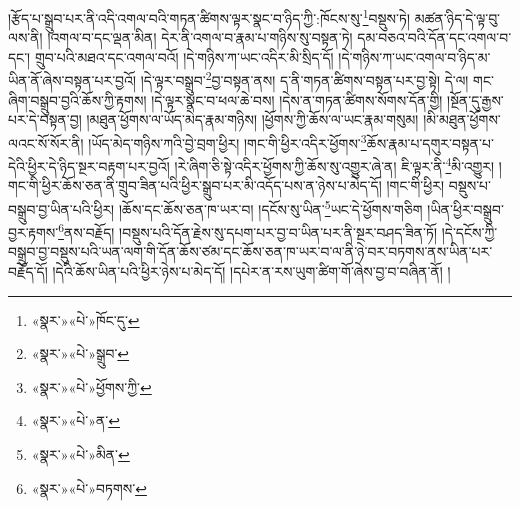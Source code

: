 །རྩོད་པ་སྒྲུབ་པར་ནི་འདི་འགལ་བའི་གཏན་ཚིགས་ལྟར་སྣང་བ་ཉིད་ཀྱི་:ཁོངས་སུ་\footnote{«སྣར་»«པེ་»ཁོང་དུ་}བསྡུས་ཏེ། མཚན་ཉིད་དེ་ལྟ་བུ་ལས་ནི། །འགལ་བ་དང་ལྡན་མིན། དེར་ནི་འགལ་བ་རྣམ་པ་གཉིས་སུ་བསྟན་ཏེ། དམ་བཅའ་བའི་དོན་དང་འགལ་བ་དང་། གྲུབ་པའི་མཐའ་དང་འགལ་བའོ། །དེ་གཉིས་ཀ་ཡང་འདིར་མི་སྲིད་དོ། །དེ་གཉིས་ཀ་ཡང་འགལ་བ་ཉིད་མ་ཡིན་ནོ་ཞེས་བསྟན་པར་བྱའོ། །དེ་ལྟར་བསྒྲུབ་\footnote{«སྣར་»«པེ་»སྒྲུབ་}བྱ་བསྟན་ནས། ད་ནི་གཏན་ཚིགས་བསྟན་པར་བྱ་སྟེ། དེ་ལ། གང་ཞིག་བསྒྲུབ་བྱའི་ཆོས་ཀྱི་རྟགས། །དེ་ལྟར་སྣང་བ་ཕལ་ཆེ་བས། །དེས་ན་གཏན་ཚིགས་སོགས་དོན་གྱི། །སྔོན་དུ་རྒྱས་པར་དེ་བསྟན་བྱ། །མཐུན་ཕྱོགས་ལ་ཡོད་མེད་རྣམ་གཉིས། །ཕྱོགས་ཀྱི་ཆོས་ལ་ཡང་རྣམ་གསུམ། །མི་མཐུན་ཕྱོགས་ལའང་སོ་སོར་ནི། །ཡོད་མེད་གཉིས་ཀའི་བྱེ་བྲག་ཕྱིར། །གང་གི་ཕྱིར་འདིར་ཕྱོགས་\footnote{«སྣར་»«པེ་»ཕྱོགས་ཀྱི་}ཆོས་རྣམ་པ་དགུར་བསྟན་པ་དེའི་ཕྱིར་དེ་ཉིད་སྔར་བརྟག་པར་བྱའོ། །རེ་ཞིག་ཅི་སྟེ་འདིར་ཕྱོགས་ཀྱི་ཆོས་སུ་འགྱུར་ཞེ་ན། ཇི་ལྟར་ནི་\footnote{«སྣར་»«པེ་»ན་}མི་འགྱུར། །གང་གི་ཕྱིར་ཆོས་ཅན་ནི་གྲུབ་ཟིན་པའི་ཕྱིར་སྒྲུབ་པར་མི་འདོད་པས་ན་ཉེས་པ་མེད་དོ། །གང་གི་ཕྱིར། བསྡུས་པ་བསྒྲུབ་བྱ་ཡིན་པའི་ཕྱིར། །ཆོས་དང་ཆོས་ཅན་ཁ་ཡར་བ། །དངོས་སུ་ཡིན་\footnote{«སྣར་»«པེ་»མིན་}ཡང་དེ་ཕྱོགས་གཅིག །ཡིན་ཕྱིར་བསྒྲུབ་བྱར་རྟགས་\footnote{«སྣར་»«པེ་»བཏགས་}ནས་བརྗོད། །བསྡུས་པའི་དོན་རྗེས་སུ་དཔག་པར་བྱ་བ་ཡིན་པར་ནི་སྔར་བཤད་ཟིན་ཏོ། །དེ་དངོས་ཀྱི་བསྒྲུབ་བྱ་བསྡུས་པའི་ཡན་ལག་གི་དོན་ཆོས་ཙམ་དང་ཆོས་ཅན་ཁ་ཡར་བ་ལ་ནི་ཉེ་བར་བཏགས་ནས་ཡིན་པར་བརྗོད་དོ། །དེའི་ཆོས་ཡིན་པའི་ཕྱིར་ཉེས་པ་མེད་དོ། །དཔེར་ན་རས་ཡུག་ཚིག་གོ་ཞེས་བྱ་བ་བཞིན་ནོ། །
